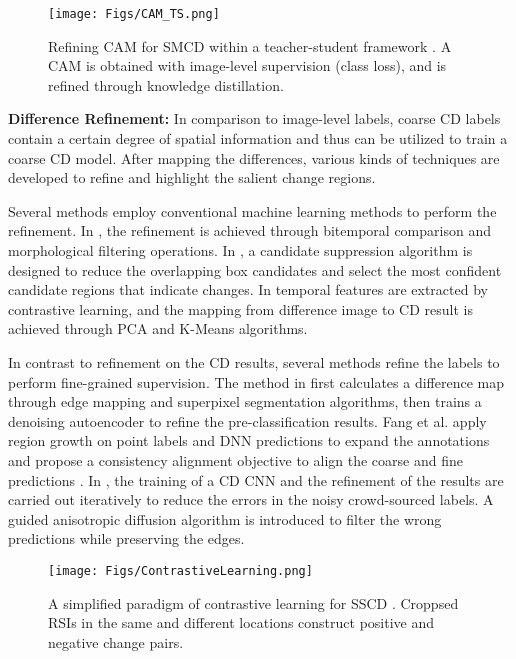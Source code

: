 \begin{figure}[t!]
	\begin{center}
        \texttt{[image: Figs/CAM\_TS.png]}
	\end{center}
	\caption{Refining CAM for SMCD within a teacher-student framework \cite{lu2024weakly}. A CAM is obtained with image-level supervision (class loss), and is refined through knowledge distillation.} \label{fig.CAM_TS}
\end{figure}

\textbf{Difference Refinement:} In comparison to image-level labels, coarse CD labels contain a certain degree of spatial information and thus can be utilized to train a coarse CD model. After mapping the differences, various kinds of techniques are developed to refine and highlight the salient change regions.

Several methods employ conventional machine learning methods to perform the refinement. In \cite{zheng2021weakly}, the refinement is achieved through bitemporal comparison and morphological filtering operations. In \cite{khan2017forest}, a candidate suppression algorithm is designed to reduce the overlapping box candidates and select the most confident candidate regions that indicate changes. In \cite{kalita2021land} temporal features are extracted by contrastive learning, and the mapping from difference image to CD result is achieved through PCA and K-Means algorithms. 

In contrast to refinement on the CD results, several methods refine the labels to perform fine-grained supervision. The method in \cite{lu2020weakly} first calculates a difference map through edge mapping and superpixel segmentation algorithms, then trains a denoising autoencoder to refine the pre-classification results. Fang et al. apply region growth on point labels and DNN predictions to expand the annotations and propose a consistency alignment objective to align the coarse and fine predictions \cite{fang2023point}. In \cite{daudt2023weakly}, the training of a CD CNN and the refinement of the results are carried out iteratively to reduce the errors in the noisy crowd-sourced labels. A guided anisotropic diffusion algorithm is introduced to filter the wrong predictions while preserving the edges.


\begin{figure*}[t!]
	\begin{center}
        \texttt{[image: Figs/ContrastiveLearning.png]}
	\end{center}
	\caption{A simplified paradigm of contrastive learning for SSCD \cite{chen2022self}. Croppsed RSIs in the same and different locations construct positive and negative change pairs.}
	\label{fig.Contrastive}
\end{figure*}

